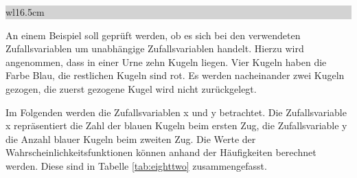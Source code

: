\noindent
\colorbox{lightgray}{%
%
\renewcommand\arraystretch{0.6}%
\begin{tabular}{ wl{16.5cm} }
{\selectfont
{}}
\end{tabular}%
}\medskip

\noindent An einem Beispiel soll gepr\"{u}ft werden, ob es sich bei den verwendeten Zufallsvariablen um unabh\"{a}ngige Zufallsvariablen handelt. Hierzu wird angenommen, dass in einer Urne zehn Kugeln liegen. Vier Kugeln haben die Farbe Blau, die restlichen Kugeln sind rot. Es werden nacheinander zwei Kugeln gezogen, die zuerst gezogene Kugel wird nicht zur\"{u}ckgelegt.\newline

\noindent Im Folgenden werden die Zufallsvariablen x und y betrachtet. Die Zufallsvariable x repr\"{a}sentiert die Zahl der blauen Kugeln beim ersten Zug, die Zufallsvariable y die Anzahl blauer Kugeln beim zweiten Zug. Die Werte der Wahrscheinlichkeitsfunktionen k\"{o}nnen anhand der H\"{a}ufigkeiten berechnet werden. Diese sind in Tabelle \ref{tab:eighttwo} zusammengefasst.

\clearpage

